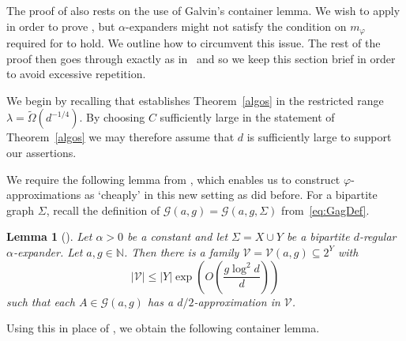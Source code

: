 \documentclass[a4paper]{amsart}
\newtheorem{lem}[thm]{Lemma}
\theoremstyle{definition}
\newcommand{\cG}{\mathcal{G} }
\newcommand{\cV}{\mathcal{V} }
\newcommand{\beq}[1]{\begin{equation}\label{#1}}
\newcommand{\enq}[0]{\end{equation}}
\newcommand{\0}[0]{\emptyset}
\newcommand{\lam}{\lambda}
\begin{document}
The proof of \cite[Theorem 2]{jenssen2023approximately} also rests on the use of Galvin's container lemma. We wish to apply  in order to prove , but $\alpha$-expanders might not satisfy the condition on $m_\varphi$ required for  to hold. We outline how to circumvent this issue. The rest of the proof then goes through exactly as in~\cite{jenssen2023approximately} and so
we keep this section brief in order to avoid excessive repetition. 

We begin by recalling that \cite[Theorem 2]{jenssen2023approximately} establishes Theorem~\ref{algos} in the restricted range $\lam=\tilde \Omega(d^{-1/4})$. By choosing $C$ sufficiently large in the statement of Theorem~\ref{algos} we may therefore assume that $d$ is sufficiently large to support our assertions. 

We require the following lemma from \cite{jenssen2023approximately}, which enables us to construct $\varphi$-approximations as `cheaply' in this new setting as  did before. For a bipartite graph $\Sigma$, recall the definition of $\cG(a,g)=\cG(a,g,\Sigma)$ from~\eqref{eq:GagDef}.

\begin{lem}[{\cite[Lemma 7]{jenssen2023approximately}}]\label{lem.ess}
	Let $\alpha>0$ be a constant and let $\Sigma=X\cup Y$ be a bipartite $d$-regular $\alpha$-expander. Let $a, g\in \mathbb{N}$. Then there is a family $\cV=\cV(a, g)\subseteq 2^Y$ with
\beq{eq.ess} |\cV|\leq |Y|\exp \left(O\left(\frac{g\log^2 d}{d}\right)\right) \enq
such that each $A\in \cG(a, g)$ has a $d/2$-approximation in $\cV$.
\end{lem}

Using this in place of , we obtain the following container lemma.
\end{document}

